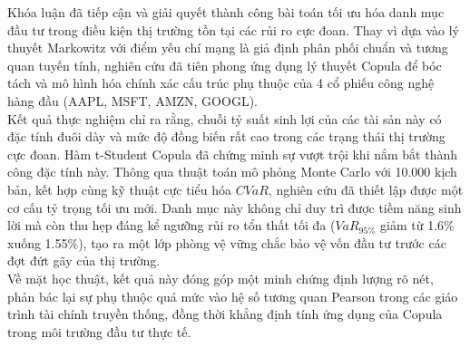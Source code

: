 Khóa luận đã tiếp cận và giải quyết thành công bài toán tối ưu hóa danh mục đầu tư trong điều kiện thị trường tồn tại các rủi ro cực đoan. Thay vì dựa vào lý thuyết Markowitz với điểm yếu chí mạng là giả định phân phối chuẩn và tương quan tuyến tính, nghiên cứu đã tiên phong ứng dụng lý thuyết Copula để bóc tách và mô hình hóa chính xác cấu trúc phụ thuộc của 4 cổ phiếu công nghệ hàng đầu (AAPL, MSFT, AMZN, GOOGL).\\
Kết quả thực nghiệm chỉ ra rằng, chuỗi tỷ suất sinh lợi của các tài sản này có đặc tính đuôi dày và mức độ đồng biến rất cao trong các trạng thái thị trường cực đoan. Hàm t-Student Copula đã chứng minh sự vượt trội khi nắm bắt thành công đặc tính này. Thông qua thuật toán mô phỏng Monte Carlo với 10.000 kịch bản, kết hợp cùng kỹ thuật cực tiểu hóa $CVaR$, nghiên cứu đã thiết lập được một cơ cấu tỷ trọng tối ưu mới. Danh mục này không chỉ duy trì được tiềm năng sinh lời mà còn thu hẹp đáng kể ngưỡng rủi ro tổn thất tối đa ($VaR_{95\%}$ giảm từ 1.6\% xuống 1.55\%), tạo ra một lớp phòng vệ vững chắc bảo vệ vốn đầu tư trước các đợt đứt gãy của thị trường.\\
Về mặt học thuật, kết quả này đóng góp một minh chứng định lượng rõ nét, phản bác lại sự phụ thuộc quá mức vào hệ số tương quan Pearson trong các giáo trình tài chính truyền thống, đồng thời khẳng định tính ứng dụng của Copula trong môi trường đầu tư thực tế. 
